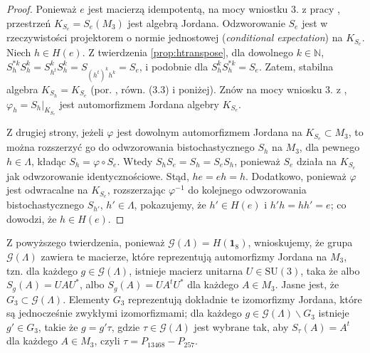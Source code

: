 \begin{proof}
    Ponieważ $e$ jest macierzą idempotentą, na mocy
    wniostku 3. z pracy \cite{miller2015stable},
    przestrzeń $K_{S_{e}} = S_{e}(M_{3})$ jest algebrą Jordana.
    Odzworowanie $S_{e}$ jest w rzeczywistości
    projektorem o normie jednostowej (\emph{conditional expectation})
    na $K_{S_{e}}$.
    Niech $h \in H(e)$.
    Z twierdzenia \ref{prop:htranspose}, dla dowolnego $k\in \mathbb{N}$,
    $S_{h}^{* k} S_{h}^{k} = S_{h^{t}}^{k} S_{h}^{k} =  S_{(h^{t})^{k} h^{k}} = S_{e}$,
    i podobnie dla $S_{h}^{k} S_{h}^{* k}= S_{e}$.
    Zatem, stabilna algebra $K_{S_{h}} = K_{S_{e}}$
    (por. \cite{miller2015stable}, równ. (3.3) i poniżej).
    Znów na mocy wniosku 3. z \cite{miller2015stable},
    $\varphi_{h} = S_{h} \big |_{K_{S_{e}}}$
    jest automorfizmem Jordana algebry $K_{S_{e}}$.

Z drugiej strony, jeżeli $\varphi$ jest dowolnym automorfizmem Jordana na
$K_{S_{e}} \subset M_{3}$,
to można rozszerzyć go do odwzorowania bistochastycznego $S_{h}$ na $M_{3}$,
dla pewnego $h \in \Lambda$,
kładąc $S_{h} = \varphi \circ S_{e}$.
Wtedy
    $S_{h} S_{e} = S_{h} = S_{e} S_{h}$,
ponieważ $S_{e}$ działa na $K_{S_{e}}$ jak odwzorowanie identycznościowe.
Stąd, $he = eh = h$.
Dodatkowo, ponieważ $\varphi$ jest odwracalne na $K_{S_{e}}$,
rozszerzając $\varphi^{-1}$ do kolejnego odwzorowania bistochastycznego
    $S_{h'}$,  $h' \in \Lambda$,
pokazujemy, że $h' \in H(e)$ i $h' h = h h' = e$;
co dowodzi, że $h \in H(e)$.
\end{proof}
\begin{Remark}
Z powyższego twierdzenia, ponieważ $\mathcal{G}(\Lambda) = H(\mathbf{1}_{8})$,
wnioskujemy, że grupa $\mathcal{G}(\Lambda)$ zawiera te macierze,
które reprezentują automorfizmy Jordana na $M_{3}$,
tzn. dla każdego $g \in \mathcal{G}(\Lambda)$,
istnieje macierz unitarna $U \in \text{SU}(3)$, taka że
albo $S_{g}(A) = U A U^{*}$, albo $S_{g}(A) = U A^{t} U^{*}$
dla każdego $A \in M_{3}$.
Jasne jest, że $G_{3} \subset \mathcal{G}(\Lambda)$.
Elementy $G_{3}$ reprezentują dokładnie te izomorfizmy Jordana,
które są jednocześnie zwykłymi izomorfizmami;
dla każdego $g \in \mathcal{G}(\Lambda) \backslash G_{3}$ istnieje
$g' \in G_{3}$, takie że $g = g' \tau$,
gdzie $\tau \in \mathcal{G}(\Lambda)$ jest wybrane tak, aby
$S_{\tau}(A) = A^{t}$ dla każdego $A \in M_{3}$,
czyli
$\tau = P_{13468} - P_{257}$.
\end{Remark}

